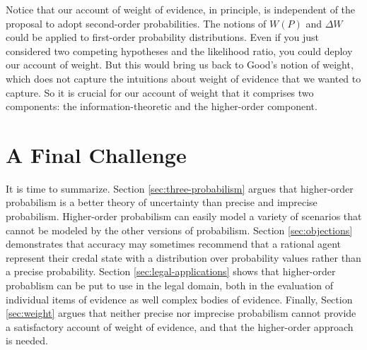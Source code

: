 \documentclass[
  10pt,
  dvipsnames,enabledeprecatedfontcommands]{scrartcl}
\begin{document}
Notice that our account of weight of evidence, in principle, is
independent of the proposal to adopt second-order probabilities. The
notions of \(W(P)\) and \(\Delta W\) could be applied to first-order
probability distributions. Even if you just considered two competing
hypotheses and the likelihood ratio, you could deploy our account of
weight. But this would bring us back to Good's notion of weight, which
does not capture the intuitions about weight of evidence that we wanted
to capture. So it is crucial for our account of weight that it comprises
two components: the information-theoretic and the higher-order
component.

\hypertarget{a-final-challenge}{%
\section{A Final Challenge}\label{a-final-challenge}}

It is time to summarize. Section \ref{sec:three-probabilism} argues that
higher-order probabilism is a better theory of uncertainty than precise
and imprecise probabilism. Higher-order probabilism can easily model a
variety of scenarios that cannot be modeled by the other versions of
probabilism. Section \ref{sec:objections} demonstrates that accuracy may
sometimes recommend that a rational agent represent their credal state
with a distribution over probability values rather than a precise
probability. Section \ref{sec:legal-applications} shows that
higher-order probablism can be put to use in the legal domain, both in
the evaluation of individual items of evidence as well complex bodies of
evidence. Finally, Section \ref{sec:weight} argues that neither precise
nor imprecise probabilism cannot provide a satisfactory account of
weight of evidence, and that the higher-order approach is needed.
\end{document}
